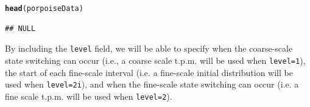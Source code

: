 \documentclass[12pt]{article}\usepackage[]{graphicx}\usepackage[]{color}
\makeatletter
\newcommand{\hlstd}[1]{\textcolor[rgb]{0.345,0.345,0.345}{#1}}%
\newcommand{\hlkwd}[1]{\textcolor[rgb]{0.737,0.353,0.396}{\textbf{#1}}}%
\newenvironment{kframe}{%
 \def\at@end@of@kframe{}%
 \ifinner\ifhmode%
  \def\at@end@of@kframe{\end{minipage}}%
  \begin{minipage}{\columnwidth}%
 \fi\fi%
 \def\FrameCommand##1{\hskip\@totalleftmargin \hskip-\fboxsep
 \colorbox{shadecolor}{##1}\hskip-\fboxsep
     \hskip-\linewidth \hskip-\@totalleftmargin \hskip\columnwidth}%
 \MakeFramed {\advance\hsize-\width
   \@totalleftmargin\z@ \linewidth\hsize
   \@setminipage}}%
 {\par\unskip\endMakeFramed%
 \at@end@of@kframe}
\newenvironment{knitrout}{}{} %
\makeatother
\begin{document}
\begin{knitrout}
\begin{kframe}
{\ttfamily\noindent\bfseries\color{errorcolor}{\#\# Error: \$ operator is invalid for atomic vectors}}\begin{alltt}
\hlkwd{head}\hlstd{(porpoiseData)}
\end{alltt}
\begin{verbatim}
## NULL
\end{verbatim}
\end{kframe}
\end{knitrout}
\noindent By including the \verb|level| field, we will be able to specify when the coarse-scale state switching can occur (i.e., a coarse scale t.p.m. will be used when \verb|level=1|), the start of each fine-scale interval (i.e. a fine-scale initial distribution will be used when \verb|level=2i|), and when the fine-scale state switching can occur (i.e. a fine scale t.p.m. will be used when \verb|level=2|).
\end{document}
